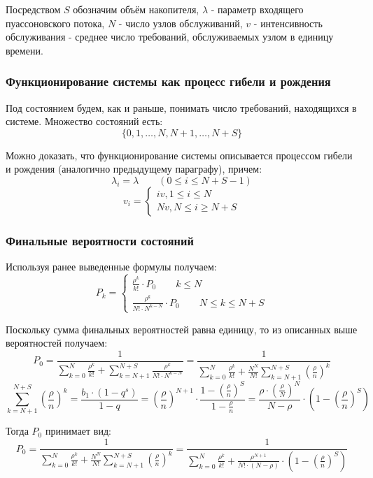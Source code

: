 \documentclass[aps,%
12pt,%
final,%
oneside,
onecolumn,%
musixtex, %
superscriptaddress,%
centertags]{article} %
\theoremstyle{plain}
\theoremstyle{definition}
\theoremstyle{remark}
\begin{document}
Посредством $S$ обозначим объём накопителя, $\lambda$ - параметр входящего пуассоновского потока, $N$ - число узлов обслуживаний, $v$ - интенсивность обслуживания - среднее число требований, обслуживаемых узлом в единицу времени.

\subsubsection{Функционирование системы как процесс гибели и рождения}

Под состоянием будем, как и раньше, понимать число требований, находящихся в системе. Множество состояний есть:
$$\{0,1,\ldots,N,N+1,\ldots,N+S\}$$

Можно доказать, что функционирование системы описывается процессом гибели и рождения (аналогично предыдущему параграфу), причем:
$$ \lambda_i  = \lambda \qquad (0\leq i \leq N+S-1)$$
$$v_i = \begin{cases}
	iv, 1\leq i \leq N \\
	Nv, N \leq i \geq N + S
\end{cases}$$

\subsubsection{Финальные вероятности состояний}

Используя ранее выведенные формулы получаем:
$$P_k = \begin{cases}
	\frac{\rho^k}{k!} \cdot P_0 \qquad k \leq N\\
	\frac{\rho^k}{N! \cdot N^{k-N}} \cdot P_0 \qquad N \leq k \leq N + S
\end{cases}$$

Поскольку сумма финальных вероятностей равна единицу, то из описанных выше вероятностей получаем:
$$P_0 = \frac{1}{\sum\limits_{k=0}^N \frac{\rho^k}{k!} + \sum\limits_{k=N+1}^{N+S} \frac{\rho^k}{N! \cdot N^{k-N}}} =  \frac{1}{\sum\limits_{k=0}^N \frac{\rho^k}{k!} + \frac{N^N}{N!}\sum\limits_{k=N+1}^{N+S}\left(\frac{\rho}{n}\right)^k}$$
$$\sum\limits_{k=N+1}^{N+S}\left(\frac{\rho}{n}\right)^k = \frac{b_1 \cdot (1-q^s)}{1-q} = \left(\frac{\rho}{n}\right)^{N+1} \cdot \frac{1-\left(\frac{\rho}{n}\right)^S}{1-\frac{\rho}{n}} = \frac{\rho \cdot \left(\frac{\rho}{N}\right)^{N}}{N-\rho} \cdot \left(1-\left(\frac{\rho}{n}\right)^S\right)$$

Тогда $P_0$ принимает вид:
$$P_0 = \frac{1}{\sum\limits_{k=0}^N \frac{\rho^k}{k!} + \frac{N^N}{N!}\sum\limits_{k=N+1}^{N+S}\left(\frac{\rho}{n}\right)^k} = \frac{1}{\sum\limits_{k=0}^N \frac{\rho^k}{k!} + \frac{\rho^{N+1}}{N! \cdot (N-\rho)}\cdot \left(1-\left(\frac{\rho}{n}\right)^S\right)} $$
\end{document}
